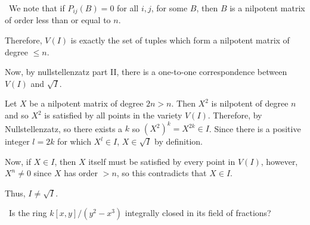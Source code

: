\documentclass[12pt]{AlgebraQual}
\begin{document}
\begin{solution}$\,$
We note that if $P_{ij}(B)=0$ for all $i,j$, for some $B$, then $B$ is a nilpotent matrix of order less than or equal to $n$.

Therefore, $V(I)$ is exactly the set of tuples which form a nilpotent matrix of degree $\le n$.

Now, by nullstellenzatz part II, there is a one-to-one correspondence between $V(I)$ and $\sqrt{I}$.

Let $X$ be a nilpotent matrix of degree $2n>n$. Then $X^2$ is nilpotent of degree $n$ and so $X^2$ is satisfied by all points in the variety $V(I)$. Therefore, by Nullstellenzatz, so there exists a $k$ so $(X^2)^k=X^{2k}\in I$. Since there is a positive integer $l=2k$ for which $X^l\in I$, $X\in\sqrt{I}$ by definition.

Now, if $X\in I$, then $X$ itself must be satisfied by every point in $V(I)$, however, $X^n\not=0$ since $X$ has order $>n$, so this contradicts that $X\in I.$

Thus, $I\not=\sqrt{I}$.
\end{solution}
\newpage



\begin{problem} $\,$
Is the ring $k[x,y]/(y^2-x^3)$ integrally closed in its field of fractions?
\end{problem}
\end{document}
